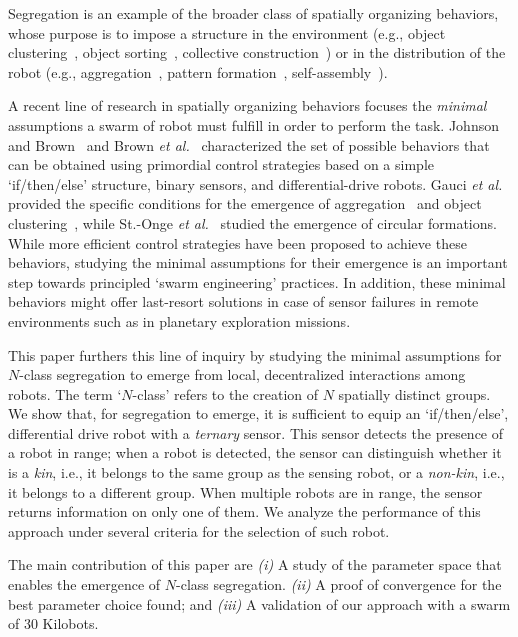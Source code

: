 \documentclass[conference]{IEEEtran}
\begin{document}
Segregation is an example of the broader class of spatially organizing
behaviors, whose purpose is to impose a structure in the environment (e.g.,
object clustering~\cite{}, object sorting~\cite{}, collective
construction~\cite{}) or in the distribution of the robot (e.g.,
aggregation~\cite{shlyakhov_survey_2017}, pattern formation~\cite{},
self-assembly~\cite{}).

A recent line of research in spatially organizing behaviors focuses the
\emph{minimal} assumptions a swarm of robot must fulfill in order to perform the
task. Johnson and Brown~\cite{johnson_evolving_2016} and Brown \emph{et
  al.}~\cite{brown_discovery_2018} characterized the set of possible behaviors
that can be obtained using primordial control strategies based on a simple
`if/then/else' structure, binary sensors, and differential-drive robots. Gauci
\emph{et al.} provided the specific conditions for the emergence of
aggregation~\cite{gauci_evolving_2014} and object
clustering~\cite{gauci_clustering_2014}, while St.-Onge \emph{et
  al.}~\cite{StOnge:IROS2018} studied the emergence of circular
formations. While more efficient control strategies have been proposed to
achieve these behaviors, studying the minimal assumptions for their emergence is
an important step towards principled `swarm engineering' practices. In addition,
these minimal behaviors might offer last-resort solutions in case of sensor
failures in remote environments such as in planetary exploration missions.

This paper furthers this line of inquiry by studying the minimal assumptions for
$N$-class segregation to emerge from local, decentralized interactions among
robots. The term `$N$-class' refers to the creation of $N$ spatially distinct
groups. We show that, for segregation to emerge, it is sufficient to equip an
`if/then/else', differential drive robot with a \emph{ternary} sensor. This
sensor detects the presence of a robot in range; when a robot is detected, the
sensor can distinguish whether it is a \emph{kin}, i.e., it belongs to the same
group as the sensing robot, or a \emph{non-kin}, i.e., it belongs to a different
group. When multiple robots are in range, the sensor returns information on only
one of them. We analyze the performance of this approach under several criteria
for the selection of such robot.

The main contribution of this paper are \emph{(i)} A study of the parameter
space that enables the emergence of $N$-class segregation. \emph{(ii)} A proof
of convergence for the best parameter choice found; and \emph{(iii)} A
validation of our approach with a swarm of 30 Kilobots.
\end{document}
